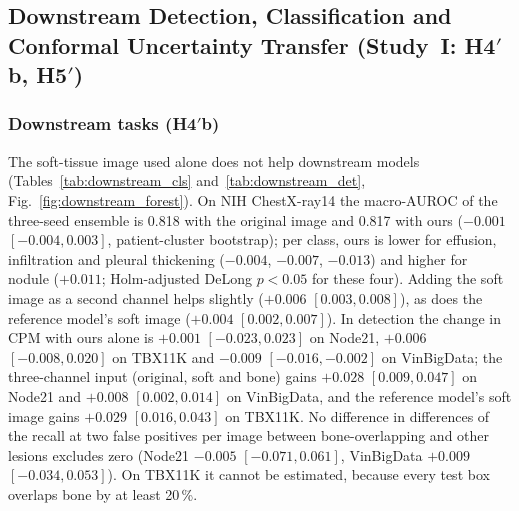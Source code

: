 \begin{table}[!t]
\centering
\caption{Twin regulariser per encoder (exploratory): absorption difference to the matched no-twin control and its interaction with bone
overlap; three seeds per model (seeds 0--2), SZCH on its 51 held-out images.}
\label{tab:encoders}
\end{table}

\subsection{Downstream Detection, Classification and Conformal Uncertainty Transfer (Study~I: H4\texorpdfstring{$'$}{'}b,
H5\texorpdfstring{$'$}{'})}
\label{sec:res-downstream}

\subsubsection{Downstream tasks (H4$'$b)}
The soft-tissue image used alone does not help downstream models (Tables~\ref{tab:downstream_cls} and~\ref{tab:downstream_det},
Fig.~\ref{fig:downstream_forest}). On NIH ChestX-ray14 the macro-AUROC of the three-seed ensemble is 0.818 with the original image and
0.817 with ours ($-0.001$ $[-0.004,0.003]$, patient-cluster bootstrap); per class, ours is lower for effusion, infiltration and pleural
thickening ($-0.004$, $-0.007$, $-0.013$) and higher for nodule ($+0.011$; Holm-adjusted DeLong $p<0.05$ for these four). Adding the soft
image as a second channel helps slightly ($+0.006$ $[0.003,0.008]$), as does the reference model's soft image ($+0.004$ $[0.002,0.007]$). In
detection the change in CPM with ours alone is $+0.001$ $[-0.023,0.023]$ on Node21, $+0.006$ $[-0.008,0.020]$ on TBX11K and $-0.009$
$[-0.016,-0.002]$ on VinBigData; the three-channel input (original, soft and bone) gains $+0.028$ $[0.009,0.047]$ on Node21 and $+0.008$
$[0.002,0.014]$ on VinBigData, and the reference model's soft image gains $+0.029$ $[0.016,0.043]$ on TBX11K. No difference in differences
of the recall at two false positives per image between bone-overlapping and other lesions excludes zero (Node21 $-0.005$
$[-0.071,0.061]$, VinBigData $+0.009$ $[-0.034,0.053]$). On TBX11K it cannot be estimated, because every test box overlaps bone by at least
20\,\%.

\begin{table}[!t]
\centering
\caption{Downstream classification on NIH ChestX-ray14: macro-AUROC of the three-seed ensemble, per-seed mean $\pm$ SD and the difference
to the original image (patient-cluster bootstrap).}
\label{tab:downstream_cls}
\end{table}

